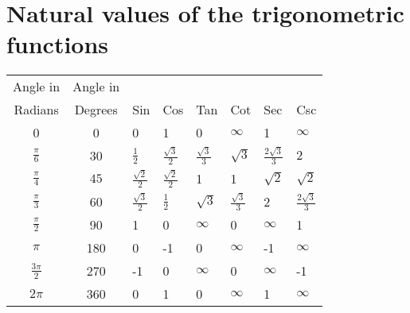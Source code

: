 \section{Natural values of the trigonometric functions}
\label{sec:4}

\begin{center}
\begin{tabular}{ccllllll}
Angle in        &  Angle in &      &       &         &     &       &      \\
Radians         & Degrees   &  Sin  &  Cos & Tan     & Cot   &   Sec & Csc \\  \hline
0               &  0        &  0     &   1  &  0      & $\infty$  &   1   & $\infty$\\
$\frac{\pi}{6}$ & 30 & $\frac{1}{2}$ & $\frac{\sqrt{3}}{2}$ & $\frac{\sqrt{3}}{3}$ & $\sqrt{3}$ & $\frac{2\sqrt{3}}{3}$ & $2$ \\
$\frac{\pi}{4}$ & $45$ & $\frac{\sqrt{2}}{2}$ & $\frac{\sqrt{2}}{2}$ & 1 & 1 & $\sqrt{2}$ & $\sqrt{2}$\\
$\frac{\pi}{3}$ & 60 & $\frac{\sqrt{3}}{2}$ & $\frac{1}{2}$ & $\sqrt{3}$ & $\frac{\sqrt{3}}{3}$ & 2 & $\frac{2\sqrt{3}}{3}$ \\
$\frac{\pi}{2}$ &  90       &  1    &   0  & $\infty$ & 0        & $\infty$ & 1 \\
$\pi$           & 180       & 	0   &  -1  &   0      & $\infty$ & -1 & $\infty$\\
$\frac{3\pi}{2}$& 270       & -1   &    0  & $\infty$ &	0 & $\infty$  & -1\\
$2\pi$         &  360       &  0   &    1  &  0       & $\infty$ & 1  & $\infty$\\
\end{tabular}
\end{center}

